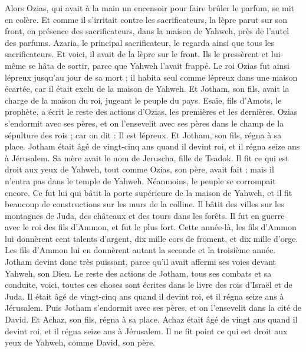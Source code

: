 \begin{multicols}{2}
Alors Ozias, qui avait à la main un encensoir pour faire brûler le parfum, se mit en colère. Et comme il s'irritait contre les sacrificateurs, la lèpre parut sur son front, en présence des sacrificateurs, dans la maison de Yahweh, près de l'autel des parfums.
Azaria, le principal sacrificateur, le regarda ainsi que tous les sacrificateurs. Et voici, il avait de la lèpre sur le front. Ils le pressèrent et lui-même se hâta de sortir, parce que Yahweh l'avait frappé.
Le roi Ozias fut ainsi lépreux jusqu'au jour de sa mort ; il habita seul comme lépreux dans une maison écartée, car il était exclu de la maison de Yahweh. Et Jotham, son fils, avait la charge de la maison du roi, jugeant le peuple du pays.
Esaïe, fils d'Amots, le prophète, a écrit le reste des actions d'Ozias, les premières et les dernières.
Ozias s'endormit avec ses pères, et on l'ensevelit avec ses pères dans le champ de la sépulture des rois ; car on dit : Il est lépreux. Et Jotham, son fils, régna à sa place.
\VerseOne{}Jotham était âgé de vingt-cinq ans quand il devint roi, et il régna seize ans à Jérusalem. Sa mère avait le nom de Jeruscha, fille de Tsadok.
Il fit ce qui est droit aux yeux de Yahweh, tout comme Ozias, son père, avait fait ; mais il n'entra pas dans le temple de Yahweh. Néanmoins, le peuple se corrompait encore.
Ce fut lui qui bâtit la porte supérieure de la maison de Yahweh, et il fit beaucoup de constructions sur les murs de la colline.
Il bâtit des villes sur les montagnes de Juda, des châteaux et des tours dans les forêts.
Il fut en guerre avec le roi des fils d'Ammon, et fut le plus fort. Cette année-là, les fils d'Ammon lui donnèrent cent talents d'argent, dix mille cors de froment, et dix mille d'orge. Les fils d'Ammon lui en donnèrent autant la seconde et la troisième année.
Jotham devint donc très puissant, parce qu'il avait affermi ses voies devant Yahweh, son Dieu.
Le reste des actions de Jotham, tous ses combats et sa conduite, voici, toutes ces choses sont écrites dans le livre des rois d'Israël et de Juda.
Il était âgé de vingt-cinq ans quand il devint roi, et il régna seize ans à Jérusalem.
Puis Jotham s'endormit avec ses pères, et on l'ensevelit dans la cité de David. Et Achaz, son fils, régna à sa place.
\VerseOne{}Achaz était âgé de vingt ans quand il devint roi, et il régna seize ans à Jérusalem. Il ne fit point ce qui est droit aux yeux de Yahweh, comme David, son père.

\end{multicols}
